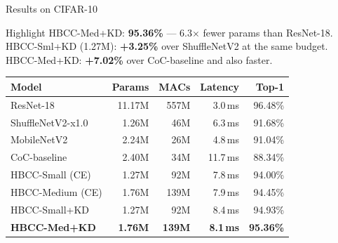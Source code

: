 \documentclass{beamer}
\begin{document}
\begin{frame}{Results on CIFAR-10}
  \begin{block}{Highlight}
    HBCC-Med+KD: \textbf{95.36\%} --- 6.3$\times$ fewer params than ResNet-18.
    HBCC-Sml+KD (1.27M): \textbf{+3.25\%} over ShuffleNetV2 at the same budget.
    HBCC-Med+KD: \textbf{+7.02\%} over CoC-baseline and also faster.
  \end{block}

  \vspace{0.15em}
  \centering\small
  \begin{tabular}{lrrrr}
    \toprule
    \textbf{Model} & \textbf{Params} & \textbf{MACs}
      & \textbf{Latency} & \textbf{Top-1} \\
    \midrule
    ResNet-18              & 11.17M & 557M & 3.0\,ms  & 96.48\% \\
    \midrule
    ShuffleNetV2-x1.0      &  1.26M &  46M & 6.3\,ms  & 91.68\% \\
    MobileNetV2            &  2.24M &  26M & 4.8\,ms  & 91.04\% \\
    CoC-baseline           &  2.40M &  34M & 11.7\,ms & 88.34\% \\
    \midrule
    HBCC-Small (CE)        &  1.27M &  92M & 7.8\,ms  & 94.00\% \\
    HBCC-Medium (CE)       &  1.76M & 139M & 7.9\,ms  & 94.45\% \\
    HBCC-Small+KD          &  1.27M &  92M & 8.4\,ms  & 94.93\% \\
    \textbf{HBCC-Med+KD}   &\textbf{1.76M}&\textbf{139M}&\textbf{8.1\,ms}&\textbf{95.36\%}\\
    \bottomrule
  \end{tabular}
\end{frame}
\end{document}
